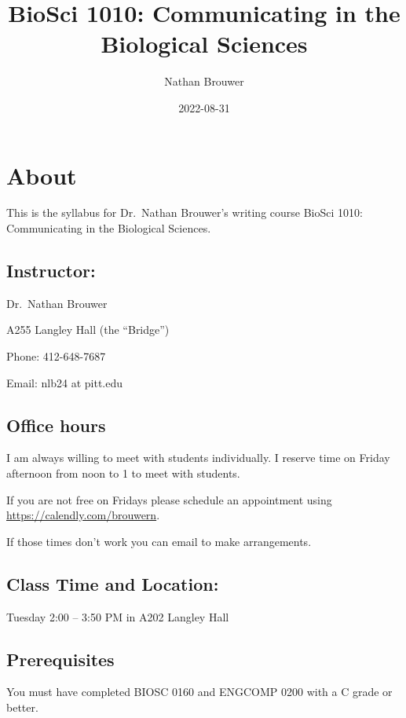 \documentclass[
]{book}
\title{BioSci 1010: Communicating in the Biological Sciences}
\author{Nathan Brouwer}
\date{2022-08-31}
\begin{document}
\maketitle

{
\setcounter{tocdepth}{1}
\tableofcontents
}
\hypertarget{about}{%
\chapter{About}\label{about}}

This is the syllabus for Dr.~Nathan Brouwer's writing course BioSci 1010: Communicating in the Biological Sciences.

\hypertarget{instructor}{%
\section{Instructor:}\label{instructor}}

Dr.~Nathan Brouwer

A255 Langley Hall (the ``Bridge'')

Phone: 412-648-7687

Email: nlb24 at pitt.edu

\hypertarget{office-hours}{%
\section{Office hours}\label{office-hours}}

I am always willing to meet with students individually. I reserve time on Friday afternoon from noon to 1 to meet with students.

If you are not free on Fridays please schedule an appointment using \url{https://calendly.com/brouwern}.

If those times don't work you can email to make arrangements.

\hypertarget{class-time-and-location}{%
\section{Class Time and Location:}\label{class-time-and-location}}

Tuesday 2:00 -- 3:50 PM in A202 Langley Hall

\hypertarget{prerequisites}{%
\section{Prerequisites}\label{prerequisites}}

You must have completed BIOSC 0160 and ENGCOMP 0200 with a C grade or better.
\end{document}

